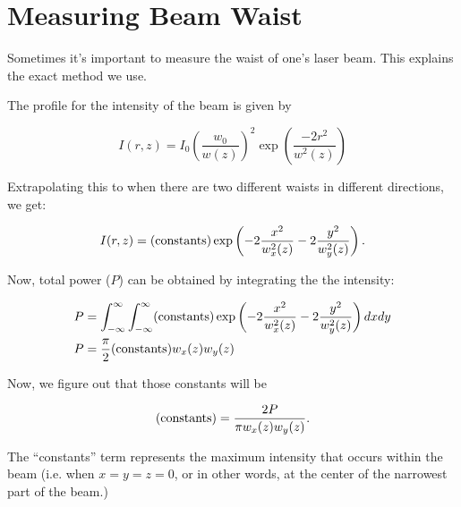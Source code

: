 \chapter{Measuring Beam Waist}
\label{BeamWaistAppendix}

Sometimes it's important to measure the waist of one's laser beam. This explains the exact method we use. 
  
The profile for the intensity of the beam is given by

\begin{equation} \label{electricFieldExplicitForm}
I(r,z)=I_0\left(\frac{w_0}{w(z)}\right)^2 \exp \left(\frac{-2 r^2}{w^2(z)}\right)
\end{equation}

Extrapolating this to when there are two different waists in different directions, we get: 

\begin{equation}
I(r,z)= ({\rm constants})\exp \left(-2\frac{x^2}{w_x^2(z)}-2\frac{y^2}{w_y^2(z)}\right) . 
\end{equation}

Now, total power ($P$) can be obtained by integrating the the intensity: 

\begin{align}
P&=\int_{-\infty}^{\infty}\int_{-\infty}^{\infty} ({\rm constants}) \exp \left(-2\frac{x^2}{w_x^2(z)}-2\frac{y^2}{w_y^2(z)}\right) dx dy\\
P&=\frac{\pi}{2} ({\rm constants}) w_x(z) w_y(z)
\end{align}

Now, we figure out that those constants will be

\begin{equation}
({\rm constants})=\frac{2 P}{\pi w_x(z) w_y(z)}.
\end{equation}

The ``constants'' term represents the maximum intensity that occurs within the beam (i.e. when $x=y=z=0$, or in other words, at the center of the narrowest part of the beam.)

